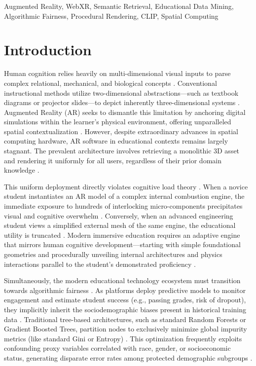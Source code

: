 \documentclass[conference]{IEEEtran}
\begin{document}
\begin{IEEEkeywords}
Augmented Reality, WebXR, Semantic Retrieval, Educational Data Mining, Algorithmic Fairness, Procedural Rendering, CLIP, Spatial Computing
\end{IEEEkeywords}

\section{Introduction}

Human cognition relies heavily on multi-dimensional visual inputs to parse complex relational, mechanical, and biological concepts \cite{peters2023webxr}. Conventional instructional methods utilize two-dimensional abstractions—such as textbook diagrams or projector slides—to depict inherently three-dimensional systems \cite{smith2024cognition}. Augmented Reality (AR) seeks to dismantle this limitation by anchoring digital simulations within the learner's physical environment, offering unparalleled spatial contextualization \cite{wilson2021embodied}. However, despite extraordinary advances in spatial computing hardware, AR software in educational contexts remains largely stagnant. The prevalent architecture involves retrieving a monolithic 3D asset and rendering it uniformly for all users, regardless of their prior domain knowledge \cite{brown2023ar}.

This uniform deployment directly violates cognitive load theory \cite{lewis2024cognitive}. When a novice student instantiates an AR model of a complex internal combustion engine, the immediate exposure to hundreds of interlocking micro-components precipitates visual and cognitive overwhelm \cite{li2021scaffolding}. Conversely, when an advanced engineering student views a simplified external mesh of the same engine, the educational utility is truncated \cite{king2023procedural}. Modern immersive education requires an adaptive engine that mirrors human cognitive development—starting with simple foundational geometries and procedurally unveiling internal architectures and physics interactions parallel to the student’s demonstrated proficiency \cite{lee2025adaptive}.

Simultaneously, the modern educational technology ecosystem must transition towards algorithmic fairness \cite{chen2022fairness}. As platforms deploy predictive models to monitor engagement and estimate student success (e.g., passing grades, risk of dropout), they implicitly inherit the sociodemographic biases present in historical training data \cite{thomas2022bias}. Traditional tree-based architectures, such as standard Random Forests or Gradient Boosted Trees, partition nodes to exclusively minimize global impurity metrics (like standard Gini or Entropy) \cite{wright2025fairtrees}. This optimization frequently exploits confounding proxy variables correlated with race, gender, or socioeconomic status, generating disparate error rates among protected demographic subgroups \cite{moore2022fairness}.
\end{document}
